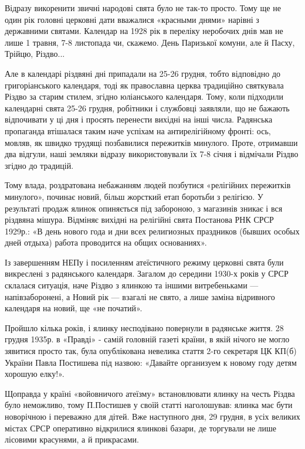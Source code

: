 
Відразу викоренити звичні народові свята було не так-то просто. Тому ще не один
рік головні церковні дати вважалися «красными днями» нарівні з державними
святами. Календар на 1928 рік в переліку неробочих днів мав не лише 1 травня,
7-8 листопада чи, скажемо. День Паризької комуни, але й Пасху, Трійцю, Різдво...


Але в календарі різдвяні дні припадали на 25-26 грудня, тобто відповідно до
григоріанського календаря, тоді як православна церква традиційно святкувала
Різдво за старим стилем, згідно юліанського календаря. Тому, коли підходили
календарні свята 25-26 грудня, робітники і службовці заявляли, що не бажають
відпочивати у ці дня і просять перенести вихідні на інші числа. Радянська
пропаганда втішалася таким наче успіхам на антирелігійному фронті: ось, мовляв,
як швидко трудящі позбавилися пережитків минулого. Проте, отримавши два
відгули, наші земляки відразу використовували їх 7-8 січня і відмічали Різдво
згідно до традицій. 

Тому влада, роздратована небажанням людей позбутися «релігійних пережитків
минулого», починає новий, більш жорсткий етап боротьби з релігією. У результаті
продаж ялинок опиняється під забороною, з магазинів зникає і вся різдвяна
мішура. Відміняє вихідні на релігійні свята Постанова РНК СРСР 1929р.: «В день
нового года и дни всех религиозных праздников (бывших особых дней отдыха)
работа проводится на общих основаниях».

Із завершенням НЕПу і посиленням атеїстичного режиму церковні свята були
викреслені з радянського календаря. Загалом до середини 1930-х років у СРСР
склалася ситуація, наче Різдво з ялинкою та іншими витребеньками —
напівзаборонені, а Новий рік — взагалі не свято, а лише заміна відривного
календаря на новий, ще «не початий».

Пройшло кілька років, і ялинку несподівано повернули в радянське життя. 28
грудня 1935р. в «Правді» - самій головній газеті країни, в якій нічого не могло
зявитися просто так, була опублікована невелика стаття 2-го секретаря ЦК КП(б)
України Павла Постишева під назвою: «Давайте организуем к новому году детям
хорошую елку!».  

Щоправда у країні «войовничого атеїзму» встановлювати ялинку на честь Різдва
було неможливо, тому П.Постишев у своїй статті наголошував: ялинка має бути
новорічною і переважно для дітей. Вже наступного дня, 29 грудня, в усіх великих
містах СРСР оперативно відкрилися ялинкові базари, де торгували не лише
лісовими красунями, а й прикрасами.

